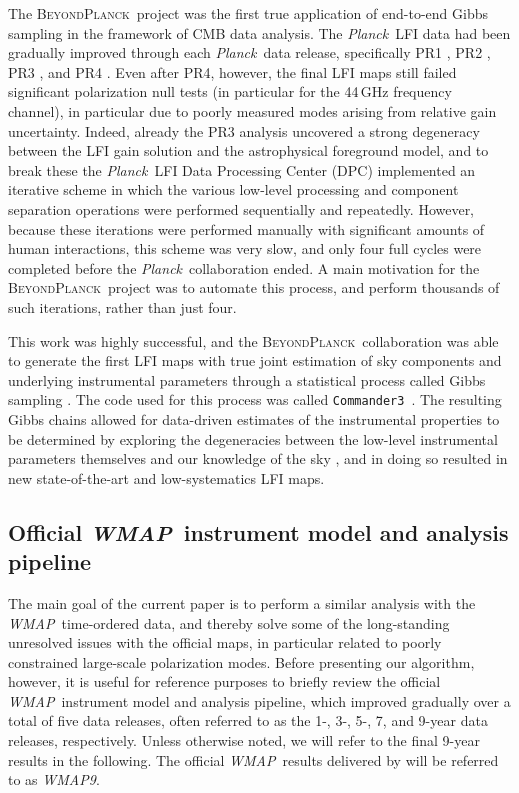 \documentclass[twocolumn]{../../common/aa}
\def\WMAP{\emph{WMAP}}
\def\WMAPnine{\emph{WMAP9}}
\def\Planck{\emph{Planck}}
\def\commanderthree{\texttt{Commander3}}
\newcommand{\BP}{\textsc{BeyondPlanck}}
\newcommand{\bp}{\textsc{BeyondPlanck}}
\begin{document}
The \bp\ project \citep{bp01} was the first true application of end-to-end Gibbs sampling in the framework of CMB data analysis. The \Planck\ LFI data had been gradually improved through each \Planck\ data release, specifically  PR1 \citep{planck2014-a03}, PR2 \citep{planck2014-a03}, PR3 \citep{planck2016-l02}, and PR4 \citep{planck2014-a03}. Even after PR4, however, the final LFI maps still failed significant polarization null tests (in particular for the 44\,GHz frequency channel), in particular due to poorly measured modes arising from relative gain uncertainty. Indeed, already the PR3 analysis  uncovered a strong degeneracy between the LFI gain solution and the astrophysical foreground model, and to break these the \Planck\ LFI Data Processing Center (DPC) implemented an iterative scheme in which the various low-level processing and component separation operations were performed sequentially and repeatedly. However, because these iterations were performed manually with significant amounts of human interactions, this scheme was very slow, and only four full cycles were completed before the \Planck\ collaboration ended. A main motivation for the \BP\ project was to automate this process, and perform thousands of such iterations, rather than just four. 

This work was highly successful, and the \bp\ collaboration was able to generate the first LFI maps with true joint estimation of sky components and underlying instrumental parameters through a statistical process called Gibbs sampling \citep{bp01,bp03,bp10}. The code used for this process was called \commanderthree\ \citep{bp03}. The resulting Gibbs chains allowed for data-driven estimates of the instrumental properties to be determined by exploring the degeneracies between the low-level instrumental parameters themselves and our knowledge of the sky \citep{bp13,bp14}, and in doing so resulted in new state-of-the-art and low-systematics LFI maps.

\subsection{Official \WMAP\ instrument model and analysis pipeline}
\label{sec:wmap_instmodel}

The main goal of the current paper is to perform a similar analysis with the \WMAP\ time-ordered data, and thereby solve some of the long-standing unresolved issues with the official maps, in particular related to poorly constrained large-scale polarization modes. Before presenting our algorithm, however, it is useful for reference purposes to briefly review the official \WMAP\ instrument model and analysis pipeline, which improved gradually over a total of five data releases, often referred to as the 1-, 3-, 5-, 7, and 9-year data releases, respectively. Unless otherwise noted, we will refer to the final 9-year results in the following. The official \WMAP\ results delivered by \citet{bennett2012} will be referred to as \WMAPnine.
\end{document}
